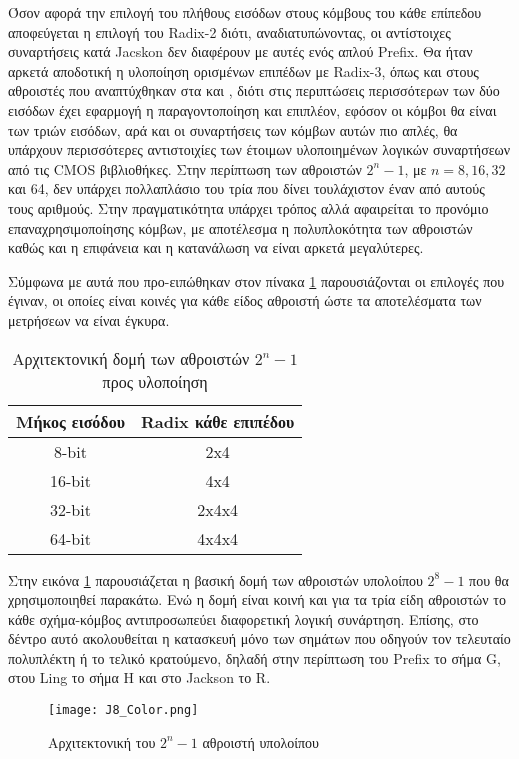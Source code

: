 Όσον αφορά την επιλογή του πλήθους εισόδων στους κόμβους του κάθε επίπεδου αποφεύγεται η επιλογή του Radix-2 διότι, αναδιατυπώνοντας, οι αντίστοιχες συναρτήσεις κατά Jacskon δεν διαφέρουν με αυτές ενός απλού Prefix. Θα ήταν αρκετά αποδοτική η υλοποίηση ορισμένων επιπέδων με Radix-3,  όπως και στους αθροιστές που αναπτύχθηκαν στα \cite{6189978} και \cite{6810474}, διότι στις περιπτώσεις περισσότερων των δύο εισόδων έχει εφαρμογή η παραγοντοποίηση και επιπλέον, εφόσον οι κόμβοι θα είναι των τριών εισόδων, αρά και οι συναρτήσεις των κόμβων αυτών πιο απλές, θα υπάρχουν περισσότερες αντιστοιχίες των έτοιμων υλοποιημένων λογικών συναρτήσεων από τις CMOS βιβλιοθήκες. Στην περίπτωση των αθροιστών $2^n-1$, με $n=8, 16, 32$ και 64, δεν υπάρχει πολλαπλάσιο του τρία που δίνει τουλάχιστον έναν από αυτούς τους αριθμούς. Στην πραγματικότητα υπάρχει τρόπος αλλά αφαιρείται το προνόμιο επαναχρησιμοποίησης κόμβων, με αποτέλεσμα η πολυπλοκότητα των αθροιστών καθώς και η επιφάνεια και η κατανάλωση να είναι αρκετά μεγαλύτερες. 

Σύμφωνα με αυτά που προ-ειπώθηκαν στον πίνακα \ref{tb:arch_2^n-1} παρουσιάζονται οι επιλογές που έγιναν, οι οποίες είναι κοινές για κάθε είδος αθροιστή ώστε τα αποτελέσματα των μετρήσεων να είναι έγκυρα.
\begin{table}[H]
\centering
     \begin{tabular}{ || c | c || } 
     \hline
     Μήκος εισόδου & Radix κάθε επιπέδου\\
     \hline\hline
     8-bit  & 2x4 \\
     16-bit & 4x4 \\
     32-bit & 2x4x4 \\
     64-bit & 4x4x4 \\
     \hline
     \end{tabular}
     \caption{Αρχιτεκτονική δομή των αθροιστών $2^n-1$ προς υλοποίηση}
     \label{tb:arch_2^n-1}
\end{table}

Στην εικόνα \ref{2^8-1_Tree_2x4} παρουσιάζεται η βασική δομή των αθροιστών υπολοίπου $2^8-1$ που θα χρησιμοποιηθεί παρακάτω. Ενώ η δομή είναι κοινή και για τα τρία είδη αθροιστών το κάθε σχήμα-κόμβος αντιπροσωπεύει διαφορετική λογική συνάρτηση. Επίσης, στο δέντρο αυτό ακολουθείται η κατασκευή μόνο των σημάτων που οδηγούν τον τελευταίο πολυπλέκτη ή το τελικό κρατούμενο, δηλαδή στην περίπτωση του Prefix το σήμα G, στου Ling το σήμα H και στο Jackson το R.
\begin{figure}[H]
    \centering
    \texttt{[image: J8\_Color.png]}
    \caption{Αρχιτεκτονική του $2^n-1$ αθροιστή υπολοίπου}
    \label{2^8-1_Tree_2x4}
\end{figure}

















